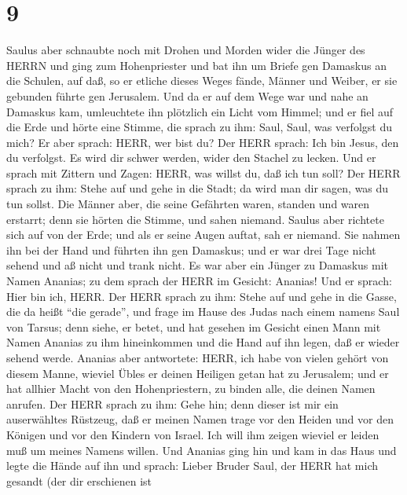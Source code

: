 \hypertarget{section-8}{%
\section{9}\label{section-8}}

 Saulus aber schnaubte noch mit Drohen und Morden wider die
Jünger des HERRN und ging zum Hohenpriester  und bat ihn um
Briefe gen Damaskus an die Schulen, auf daß, so er etliche dieses Weges
fände, Männer und Weiber, er sie gebunden führte gen Jerusalem.
 Und da er auf dem Wege war und nahe an Damaskus kam,
umleuchtete ihn plötzlich ein Licht vom Himmel;  und er fiel
auf die Erde und hörte eine Stimme, die sprach zu ihm: Saul, Saul, was
verfolgst du mich?  Er aber sprach: HERR, wer bist du? Der
HERR sprach: Ich bin Jesus, den du verfolgst. Es wird dir schwer werden,
wider den Stachel zu lecken.  Und er sprach mit Zittern und
Zagen: HERR, was willst du, daß ich tun soll? Der HERR sprach zu ihm:
Stehe auf und gehe in die Stadt; da wird man dir sagen, was du tun
sollst.  Die Männer aber, die seine Gefährten waren, standen
und waren erstarrt; denn sie hörten die Stimme, und sahen niemand.
 Saulus aber richtete sich auf von der Erde; und als er
seine Augen auftat, sah er niemand. Sie nahmen ihn bei der Hand und
führten ihn gen Damaskus;  und er war drei Tage nicht sehend
und aß nicht und trank nicht.  Es war aber ein Jünger zu
Damaskus mit Namen Ananias; zu dem sprach der HERR im Gesicht: Ananias!
Und er sprach: Hier bin ich, HERR.  Der HERR sprach zu ihm:
Stehe auf und gehe in die Gasse, die da heißt ``die gerade'', und frage
im Hause des Judas nach einem namens Saul von Tarsus; denn siehe, er
betet,  und hat gesehen im Gesicht einen Mann mit Namen
Ananias zu ihm hineinkommen und die Hand auf ihn legen, daß er wieder
sehend werde.  Ananias aber antwortete: HERR, ich habe von
vielen gehört von diesem Manne, wieviel Übles er deinen Heiligen getan
hat zu Jerusalem;  und er hat allhier Macht von den
Hohenpriestern, zu binden alle, die deinen Namen anrufen. 
Der HERR sprach zu ihm: Gehe hin; denn dieser ist mir ein auserwähltes
Rüstzeug, daß er meinen Namen trage vor den Heiden und vor den Königen
und vor den Kindern von Israel.  Ich will ihm zeigen
wieviel er leiden muß um meines Namens willen.  Und Ananias
ging hin und kam in das Haus und legte die Hände auf ihn und sprach:
Lieber Bruder Saul, der HERR hat mich gesandt (der dir erschienen ist
